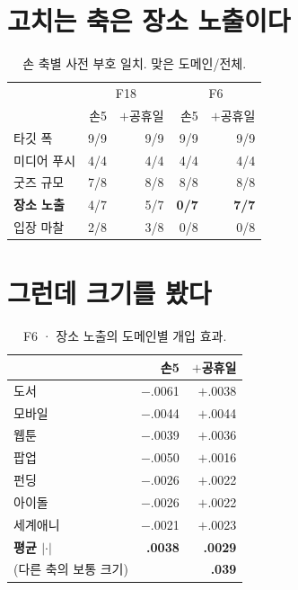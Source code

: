 \documentclass[10pt]{article}
\begin{document}

\section{고치는 축은 장소 노출이다}

\begin{table}[t]
\centering\tsize
\caption{손 축별 사전 부호 일치. 맞은 도메인/전체.}
\begin{tabular}{lrrrr}
\toprule
& \multicolumn{2}{c}{F18} & \multicolumn{2}{c}{F6} \\
& 손5 & $+$공휴일 & 손5 & $+$공휴일 \\
\midrule
타깃 폭 & 9/9 & 9/9 & 9/9 & 9/9 \\
미디어 푸시 & 4/4 & 4/4 & 4/4 & 4/4 \\
굿즈 규모 & 7/8 & 8/8 & 8/8 & 8/8 \\
\textbf{장소 노출} & 4/7 & 5/7 & \textbf{0/7} & \textbf{7/7} \\
입장 마찰 & 2/8 & 3/8 & 0/8 & 0/8 \\
\bottomrule
\end{tabular}
\end{table}


\section{그런데 크기를 봤다}

\begin{table}[t]
\centering\tsize
\caption{F6 · 장소 노출의 도메인별 개입 효과.}
\begin{tabular}{lrr}
\toprule
& 손5 & $+$공휴일 \\
\midrule
도서 & $-$.0061 & $+$.0038 \\
모바일 & $-$.0044 & $+$.0044 \\
웹툰 & $-$.0039 & $+$.0036 \\
팝업 & $-$.0050 & $+$.0016 \\
펀딩 & $-$.0026 & $+$.0022 \\
아이돌 & $-$.0026 & $+$.0022 \\
세계애니 & $-$.0021 & $+$.0023 \\
\midrule
\textbf{평균 $|\cdot|$} & \textbf{.0038} & \textbf{.0029} \\
(다른 축의 보통 크기) & \multicolumn{2}{r}{\textbf{.039}} \\
\bottomrule
\end{tabular}
\end{table}
\end{document}
